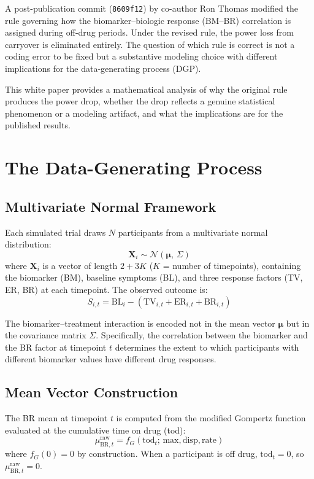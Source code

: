 \documentclass[11pt]{article}
\begin{document}
A post-publication commit (\texttt{8609f12}) by co-author Ron
Thomas modified the rule governing how the biomarker--biologic
response (BM--BR) correlation is assigned during off-drug
periods. Under the revised rule, the power loss from carryover
is eliminated entirely. The question of which rule is correct
is not a coding error to be fixed but a substantive modeling
choice with different implications for the data-generating
process (DGP).

This white paper provides a mathematical analysis of why the
original rule produces the power drop, whether the drop
reflects a genuine statistical phenomenon or a modeling
artifact, and what the implications are for the published
results.

\section{The Data-Generating Process}

\subsection{Multivariate Normal Framework}

Each simulated trial draws $N$ participants from a multivariate
normal distribution:
\[
\mathbf{X}_i \sim \mathcal{N}(\boldsymbol{\mu},\, \Sigma)
\]
where $\mathbf{X}_i$ is a vector of length $2 + 3K$ ($K$ =
number of timepoints), containing the biomarker (BM), baseline
symptoms (BL), and three response factors (TV, ER, BR) at each
timepoint. The observed outcome is:
\[
S_{i,t} = \text{BL}_i -
  (\text{TV}_{i,t} + \text{ER}_{i,t} + \text{BR}_{i,t})
\]

The biomarker--treatment interaction is encoded not in the
mean vector $\boldsymbol{\mu}$ but in the covariance matrix
$\Sigma$. Specifically, the correlation between the biomarker
and the BR factor at timepoint $t$ determines the extent to
which participants with different biomarker values have
different drug responses.

\subsection{Mean Vector Construction}

The BR mean at timepoint $t$ is computed from the modified
Gompertz function evaluated at the cumulative time on drug
(tod):
\[
\mu_{\text{BR},t}^{\text{raw}} =
  f_G(\text{tod}_t;\, \text{max}, \text{disp}, \text{rate})
\]
where $f_G(0) = 0$ by construction. When a participant is off
drug, $\text{tod}_t = 0$, so
$\mu_{\text{BR},t}^{\text{raw}} = 0$.
\end{document}
